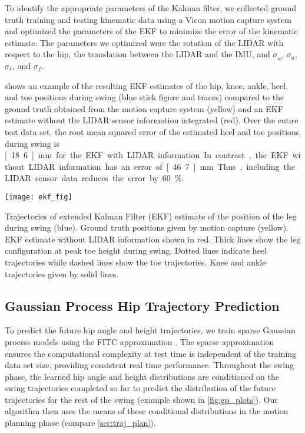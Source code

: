To identify the appropriate parameters of the Kalman filter, we collected ground
truth training and testing kinematic data using a Vicon motion capture system
and optimized the parameters of the EKF to minimize the error of the kinematic
estimate. The parameters we optimized were the rotation of the LIDAR with
respect to the hip, the translation between the LIDAR and the IMU, and
$\sigma_\omega$, $\sigma_a$, $\sigma_\ell$, and $\sigma_f$. 

 shows an example of the resulting EKF estimates of the hip, knee,
ankle, heel, and toe positions during swing (blue stick figure and traces)
compared to the ground truth obtained from the motion capture system (yellow)
and an EKF estimate without the LIDAR sensor information integrated (red). Over
the entire test data set, the root mean squared error of the estimated heel and
toe positions during swing is \unit[18.6]{mm} for the EKF with LIDAR
information. In contrast, the EKF without LIDAR information has an error of
\unit[46.7]{mm}. Thus, including the LIDAR sensor data reduces the error by
60\%.
\begin{marginfigure}
    \centering
    \texttt{[image: ekf\_fig]}
    \caption[Trajectories of extended Kalman Filter (EKF) estimate of the
    position of the leg during swing compared to ground truth data from motion
    capture system]{Trajectories of extended Kalman Filter (EKF) estimate of the
    position of the leg during swing (blue). Ground truth positions given by
    motion capture (yellow). EKF estimate without LIDAR information shown in
    red. Thick lines show the leg configuration at peak toe height during swing.
    Dotted lines indicate heel trajectories while dashed lines show the toe
    trajectories. Knee and ankle trajectories given by solid
    lines.}\label{fig:ekf}
\end{marginfigure}

\subsection{Gaussian Process Hip Trajectory Prediction}

\label{sec:predict_gp}
To predict the future hip angle and height trajectories, we train sparse
Gaussian process models using the FITC approximation \citep{snelson2007local}.
The sparse approximation ensures the computational complexity at test time is
independent of the training data set size, providing consistent real time
performance. Throughout the swing phase, the learned hip angle and height
distributions are conditioned on the swing trajectories completed so far to
predict the distribution of the future trajectories for the rest of the swing
(example shown in \cref{fig:gp_plots}). Our algorithm then uses the means of
these conditional distributions in the motion planning phase
(compare \cref{sec:traj_plan}). 

